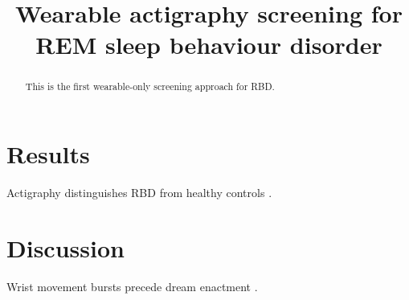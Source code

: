 \documentclass{article}
\title{Wearable actigraphy screening for REM sleep behaviour disorder}
\begin{document}
\maketitle
\begin{abstract}
This is the first wearable-only screening approach for RBD.
\end{abstract}
\section{Results}
Actigraphy distinguishes RBD from healthy controls \cite{smith2019,novak2020}.
\section{Discussion}
Wrist movement bursts precede dream enactment \cite{lee2021,garcia2022}.
\end{document}

